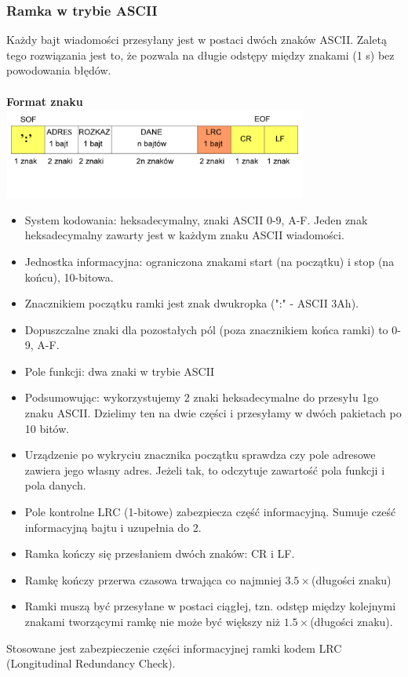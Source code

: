 \documentclass[a4paper,twoside]{article}
\begin{document}
		\subsubsection{Ramka w trybie ASCII}
			Każdy bajt wiadomości przesyłany jest w postaci dwóch znaków ASCII. Zaletą tego rozwiązania jest to, że pozwala na długie odstępy między znakami (1 s) bez powodowania błędów.\\\\\textbf{Format znaku}\\
			\includegraphics[width=10cm]{./wyklady/RS232_18_1.pdf}
			\begin{itemize}
				\item System kodowania: heksadecymalny, znaki ASCII 0-9, A-F. Jeden znak heksadecymalny zawarty jest w każdym znaku ASCII wiadomości.
				\item Jednostka informacyjna: ograniczona znakami start (na początku) i stop (na końcu), 10-bitowa.
				\item Znacznikiem początku ramki jest znak dwukropka (":" - ASCII 3Ah).
				\item Dopuszczalne znaki dla pozostałych pól (poza znacznikiem końca ramki) to 0-9, A-F.
				\item Pole funkcji: dwa znaki w trybie ASCII
				\item Podsumowując: wykorzystujemy 2 znaki heksadecymalne do przesyłu 1go znaku ASCII. Dzielimy ten na dwie części i przesyłamy w dwóch pakietach po 10 bitów.
				\item Urządzenie po wykryciu znacznika początku sprawdza czy pole adresowe zawiera jego własny adres. Jeżeli tak, to odczytuje zawartość pola funkcji i pola danych.
				\item Pole kontrolne LRC (1-bitowe) zabezpiecza część informacyjną. Sumuje cześć informacyjną bajtu i uzupełnia do 2.
				\item Ramka kończy się przesłaniem dwóch znaków: CR i LF.
				\item Ramkę kończy przerwa czasowa trwająca co najmniej $3.5\times$(długości znaku)
				\item Ramki muszą być przesyłane w postaci ciągłej, tzn. odstęp między kolejnymi znakami tworzącymi ramkę nie może być większy niż $1.5\times$(długości znaku).
			\end{itemize}
			Stosowane jest zabezpieczenie części informacyjnej ramki kodem LRC (Longitudinal Redundancy Check).
\end{document}
